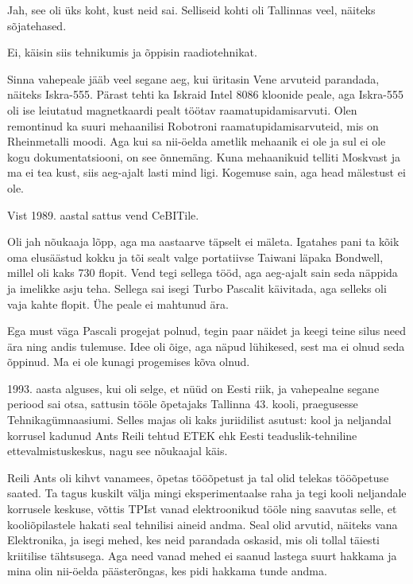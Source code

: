 Jah, see oli üks koht, kust neid sai. Selliseid kohti oli Tallinnas veel, 
näiteks sõjatehased. 


Ei, käisin siis tehnikumis ja õppisin raadiotehnikat. 


Sinna vahepeale jääb veel segane aeg, kui üritasin 
Vene arvuteid parandada, näiteks Iskra-555. Pärast 
tehti ka Iskraid Intel 8086 kloonide peale, aga Iskra-555 oli ise 
leiutatud magnetkaardi pealt töötav raamatupidamisarvuti. Olen remontinud 
ka suuri mehaanilisi Robotroni raamatupidamisarvuteid, mis on 
Rheinmetalli moodi. Aga kui sa nii-öelda ametlik mehaanik ei ole ja 
sul ei ole kogu dokumentatsiooni, on see õnnemäng. Kuna mehaanikuid telliti 
Moskvast ja ma ei tea kust, siis aeg-ajalt lasti mind ligi. Kogemuse sain, aga 
head mälestust ei ole. 

Vist 1989. aastal sattus vend CeBITile. 


Oli jah nõukaaja lõpp, aga ma aastaarve täpselt ei mäleta. Igatahes pani ta kõik oma elusäästud kokku 
ja tõi sealt valge portatiivse Taiwani läpaka Bondwell, millel oli kaks 730 flopit. Vend tegi sellega tööd, aga aeg-ajalt sain seda näppida ja imelikke asju teha. Sellega sai isegi Turbo 
Pascalit käivitada, aga selleks oli vaja 
kahte flopit. Ühe peale ei mahtunud ära. 

Ega must väga Pascali progejat polnud, tegin paar näidet 
ja keegi teine silus need ära ning andis tulemuse. Idee oli 
õige, aga näpud lühikesed, sest ma ei olnud seda õppinud. Ma ei ole kunagi
progemises kõva olnud.

1993. aasta alguses, kui oli selge, et nüüd on Eesti riik, ja vahepealne segane periood sai otsa, sattusin tööle 
õpetajaks Tallinna 
43. kooli, praegusesse 
Tehnikagümnaasiumi\label{sisu:43kool}. 
Selles majas oli kaks juriidilist asutust: kool ja 
neljandal korrusel kadunud Ants Reili 
tehtud ETEK ehk Eesti teaduslik-tehniline 
ettevalmistuskeskus, nagu see nõukaajal käis. 

Reili Ants oli 
kihvt vanamees, õpetas tööõpetust ja tal olid telekas 
tööõpetuse saated. Ta tagus kuskilt välja mingi eksperimentaalse raha 
ja tegi kooli neljandale korrusele keskuse, võttis TPIst vanad elektroonikud tööle ning saavutas selle, et 
kooliõpilastele hakati seal tehnilisi aineid andma. Seal olid arvutid, näiteks vana 
Elektronika, ja isegi mehed, kes neid parandada oskasid, mis oli tollal 
täiesti kriitilise tähtsusega. Aga need vanad mehed ei saanud lastega suurt hakkama ja 
mina olin nii-öelda päästerõngas, kes pidi hakkama tunde andma. 

